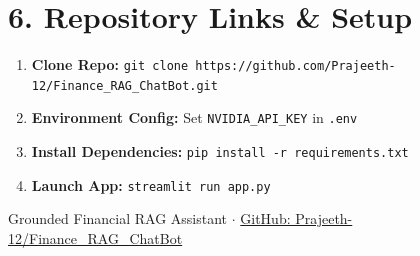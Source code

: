 \documentclass[11pt,a4paper]{article}
\begin{document}
\vspace{0.8em}

\section{6. Repository Links \& Setup}

\begin{tcolorbox}[title=Project Quick Start]
\small
\begin{enumerate}[leftmargin=1.2em, itemsep=2pt]
    \item \textbf{Clone Repo:} \texttt{git clone https://github.com/Prajeeth-12/Finance\_RAG\_ChatBot.git}
    \item \textbf{Environment Config:} Set \texttt{NVIDIA\_API\_KEY} in \texttt{.env}
    \item \textbf{Install Dependencies:} \texttt{pip install -r requirements.txt}
    \item \textbf{Launch App:} \texttt{streamlit run app.py}
\end{enumerate}
\end{tcolorbox}

\vspace{0.5em}
\begin{center}
    \small Grounded Financial RAG Assistant $\cdot$ \href{https://github.com/Prajeeth-12/Finance_RAG_ChatBot}{GitHub: Prajeeth-12/Finance\_RAG\_ChatBot}
\end{center}
\end{document}
